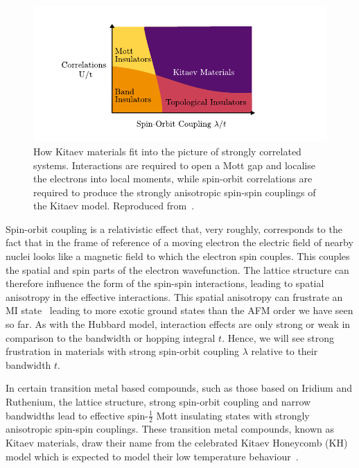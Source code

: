 \hypertarget{fig:kitaev-material-phase-diagram}{%
\begin{figure}
\centering
\includegraphics[width=1\textwidth,height=\textheight]{figure_code/intro_chapter/kitaev_material_phase_diagram}
\caption[{Phase Diagram}]{How Kitaev materials fit into the picture of strongly correlated systems. Interactions are required to open a Mott gap and localise the electrons into local moments, while spin-orbit correlations are required to produce the strongly anisotropic spin-spin couplings of the Kitaev model. Reproduced from~\autocite{TrebstPhysRep2022}.}
\label{fig:kitaev-material-phase-diagram}
\end{figure}
}

Spin-orbit coupling is a relativistic effect that, very roughly, corresponds to the fact that in the frame of reference of a moving electron the electric field of nearby nuclei looks like a magnetic field to which the electron spin couples. This couples the spatial and spin parts of the electron wavefunction. The lattice structure can therefore influence the form of the spin-spin interactions, leading to spatial anisotropy in the effective interactions. This spatial anisotropy can frustrate an MI state~\autocite{jackeliMottInsulatorsStrong2009,khaliullinOrbitalOrderFluctuations2005} leading to more exotic ground states than the AFM order we have seen so far. As with the Hubbard model, interaction effects are only strong or weak in comparison to the bandwidth or hopping integral \(t\). Hence, we will see strong frustration in materials with strong spin-orbit coupling \(\lambda\) relative to their bandwidth \(t\).

In certain transition metal based compounds, such as those based on Iridium and Ruthenium, the lattice structure, strong spin-orbit coupling and narrow bandwidths lead to effective spin-\(\tfrac{1}{2}\) Mott insulating states with strongly anisotropic spin-spin couplings. These transition metal compounds, known as Kitaev materials, draw their name from the celebrated Kitaev Honeycomb (KH) model which is expected to model their low temperature behaviour~\autocite{Jackeli2009,HerrmannsAnRev2018,Winter2017,TrebstPhysRep2022,Takagi2019}.

